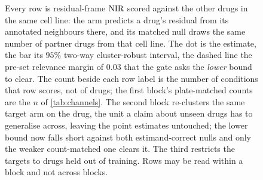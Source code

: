 \begin{figure}[htbp]
\begin{fullwidth}
\caption[The channel gate, by conditioning]{
Every row is residual-frame $\textrm{NIR}$ scored against the other drugs in the same
cell line: the arm predicts a drug's residual from its annotated neighbours
there, and its matched null draws the same number of partner drugs from that
cell line.
The dot is the estimate, the bar its $95\%$ two-way cluster-robust interval, the
dashed line the pre-set relevance margin of $0.03$ that the gate asks the
\emph{lower} bound to clear. The count beside each row label is the number of
conditions that row scores, not of drugs; the first block's plate-matched counts
are the $n$ of \cref{tab:channels}. The second block re-clusters the same target
arm on the drug, the unit a claim about unseen drugs has to generalise across,
leaving the point estimates untouched; the lower bound now falls short against both
estimand-correct nulls and only the weaker count-matched one clears it. The third
restricts the targets to drugs held out of training. Rows may be read within a
block and not across blocks.}
\label{fig:gate}
\end{fullwidth}
\end{figure}
